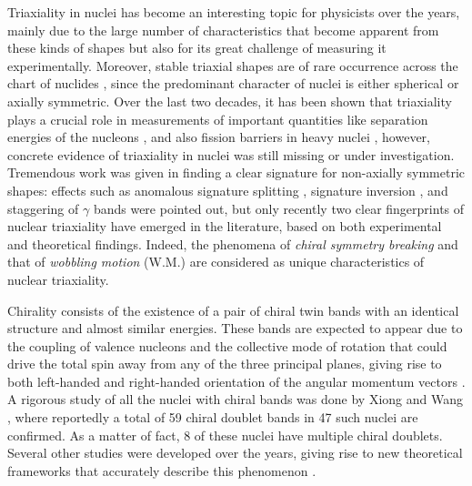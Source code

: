 \documentclass[11pt]{article}
\begin{document}
Triaxiality in nuclei has become an interesting topic for physicists over the years, mainly due to the large number of characteristics that become apparent from these kinds of shapes but also for its great challenge of measuring it experimentally. Moreover, stable triaxial shapes are of rare occurrence across the chart of nuclides \cite{moller2006global}, since the predominant character of nuclei is either spherical or axially symmetric. Over the last two decades, it has been shown that triaxiality plays a crucial role in measurements of important quantities like separation energies of the nucleons \cite{moller2006global}, and also fission barriers in heavy nuclei  \cite{moller2009heavy}, however, concrete evidence of triaxiality in nuclei was still missing or under investigation. Tremendous work was given in finding a clear signature for non-axially symmetric shapes: effects such as anomalous signature splitting \cite{hamamoto1988triaxial}, signature inversion \cite{bengtsson1984signature}, and staggering of $\gamma$ bands \cite{stachel1982triaxiality} were pointed out, but only recently two clear fingerprints of nuclear triaxiality have emerged in the literature, based on both experimental and theoretical findings. Indeed, the phenomena of \emph{chiral symmetry breaking} \cite{frauendorf1997tilted} and that of \emph{wobbling motion} (W.M.) \cite{bohr1998nuclear} are considered as unique characteristics of nuclear triaxiality. 

Chirality consists of the existence of a pair of chiral twin bands with an identical structure and almost similar energies. These bands are expected to appear due to the coupling of valence nucleons and the collective mode of rotation that could drive the total spin away from any of the three principal planes, giving rise to both left-handed and right-handed orientation of the angular momentum vectors \cite{frauendorf1997tilted}. A rigorous study of all the nuclei with chiral bands was done by Xiong and Wang \cite{xiong2019nuclear}, where reportedly a total of 59 chiral doublet bands in 47 such nuclei are confirmed. As a matter of fact, 8 of these nuclei have multiple chiral doublets. Several other studies were developed over the years, giving rise to new theoretical frameworks that accurately describe this phenomenon \cite{dimitrov2000chirality,koike2003systematic,meng2006possible,raduta2016new,petrache2018evidence,lv2019chirality}.
\end{document}
